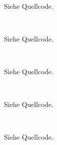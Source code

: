 \documentclass{mywork}
\begin{document}
\begin{aufgabe}~

	Siehe Quellcode.
\end{aufgabe}

\begin{aufgabe}~

	Siehe Quellcode.
\end{aufgabe}

\begin{aufgabe}~

	Siehe Quellcode.
\end{aufgabe}

\begin{aufgabe}~

	Siehe Quellcode.
\end{aufgabe}

\begin{aufgabe}~

	Siehe Quellcode.
\end{aufgabe}
\end{document}
